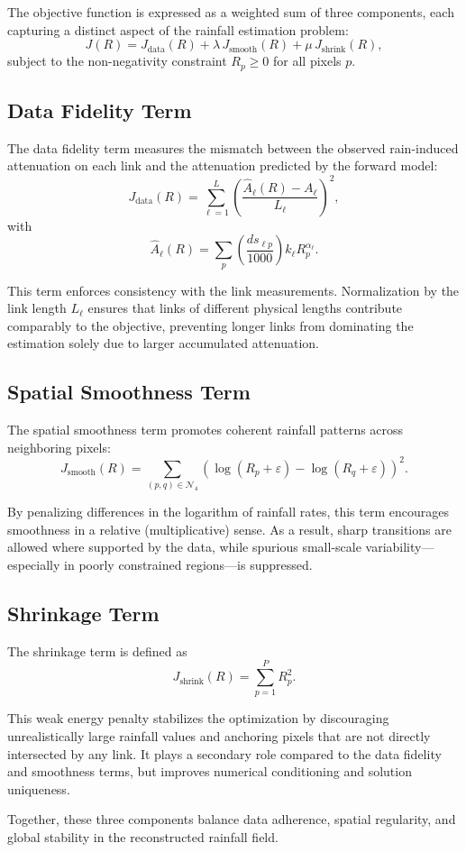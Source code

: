 \documentclass[12pt]{article}
\begin{document}
The objective function is expressed as a weighted sum of three components, each capturing a distinct aspect of the rainfall estimation problem:
\[
J(R) = J_{\mathrm{data}}(R) + \lambda\, J_{\mathrm{smooth}}(R) + \mu\, J_{\mathrm{shrink}}(R),
\]
subject to the non-negativity constraint $R_p \ge 0$ for all pixels $p$.

\subsection{Data Fidelity Term}

The data fidelity term measures the mismatch between the observed rain-induced attenuation on each link and the attenuation predicted by the forward model:
\[
J_{\mathrm{data}}(R)
=
\sum_{\ell=1}^{L}
\left(
\frac{\hat A_\ell(R) - A_\ell}{L_\ell}
\right)^2,
\]
with
\[
\hat A_\ell(R)
=
\sum_{p}
\left(\frac{ds_{\ell p}}{1000}\right)
k_\ell R_p^{\alpha_\ell}.
\]

This term enforces consistency with the link measurements. Normalization by the link length $L_\ell$ ensures that links of different physical lengths contribute comparably to the objective, preventing longer links from dominating the estimation solely due to larger accumulated attenuation.

\subsection{Spatial Smoothness Term}

The spatial smoothness term promotes coherent rainfall patterns across neighboring pixels:
\[
J_{\mathrm{smooth}}(R)
=
\sum_{(p,q)\in\mathcal N_4}
\left(
\log(R_p+\varepsilon)-\log(R_q+\varepsilon)
\right)^2.
\]

By penalizing differences in the logarithm of rainfall rates, this term encourages smoothness in a relative (multiplicative) sense. As a result, sharp transitions are allowed where supported by the data, while spurious small-scale variability—especially in poorly constrained regions—is suppressed.

\subsection{Shrinkage Term}

The shrinkage term is defined as
\[
J_{\mathrm{shrink}}(R)
=
\sum_{p=1}^{P} R_p^2.
\]

This weak energy penalty stabilizes the optimization by discouraging unrealistically large rainfall values and anchoring pixels that are not directly intersected by any link. It plays a secondary role compared to the data fidelity and smoothness terms, but improves numerical conditioning and solution uniqueness.

Together, these three components balance data adherence, spatial regularity, and global stability in the reconstructed rainfall field.
\end{document}
